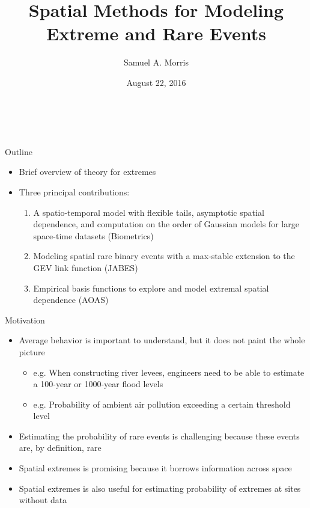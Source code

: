\documentclass{beamer}
\title[Spatial methods for EVA] %
{
  Spatial Methods for Modeling Extreme and Rare Events
}
\author[S. Morris]{Samuel A. Morris}
\institute[]{North Carolina State University}
\date[]{August 22, 2016}
\begin{document}
\begin{frame}\frametitle{\ }
\begin{center}
  \maketitle
\end{center}
\end{frame}


\begin{frame}{Outline}
\begin{itemize} \setlength{\itemsep}{1em}
	\item Brief overview of theory for extremes
	\item Three principal contributions:
	\begin{enumerate}[1.]\setlength{\itemsep}{0.5em}
		\item A spatio-temporal model with flexible tails, asymptotic spatial dependence, and computation on the order of Gaussian models for large space-time datasets (Biometrics)
		\item Modeling spatial rare binary events with a max-stable extension to the GEV link function (JABES)
		\item Empirical basis functions to explore and model extremal spatial dependence (AOAS)
	\end{enumerate}
\end{itemize}	
\end{frame}

\begin{frame}{Motivation}
  \begin{itemize} \setlength{\itemsep}{1em}
    \item Average behavior is important to understand, but it does not paint the whole picture
    \begin{itemize}
      \item e.g. When constructing river levees, engineers need to be able to estimate a 100-year or 1000-year flood levels
      \item e.g. Probability of ambient air pollution exceeding a certain threshold level
    \end{itemize}
    \item Estimating the probability of rare events is challenging because these events are, by definition, rare
    \item Spatial extremes is promising because it borrows information across space
    \item Spatial extremes is also useful for estimating probability of extremes at sites without data
  \end{itemize}
\end{frame}
\end{document}
